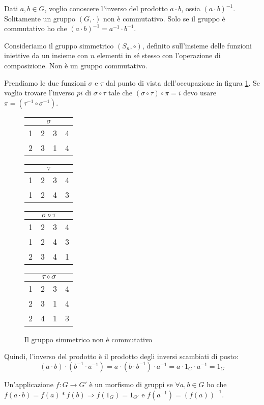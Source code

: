 Dati $a, b \in G$, voglio conoscere l'inverso del prodotto $a \cdot b$, ossia $(a \cdot b)^{-1}$. Solitamente un gruppo $(G, \cdot)$ non \`e commutativo. Solo se il gruppo \`e commutativo ho che $(a \cdot b)^{-1} = a^{-1} \cdot b^{-1}$.

Consideriamo il gruppo simmetrico $(S_n, \circ)$, definito sull'insieme delle funzioni iniettive da un insieme con $n$ elementi in s\'e stesso con l'operazione di composizione. Non \`e un gruppo commutativo.

Prendiamo le due funzioni $\sigma$ e $\tau$ dal punto di vista dell'occupazione in figura \ref{fig:gruppo_simmetrico}. Se voglio trovare l'inverso $pi$ di $\sigma \circ \tau$ tale che $(\sigma \circ \tau) \circ \pi = i$ devo usare $\pi = (\tau^{-1} \circ \sigma^{-1})$.

\begin{figure}[ht]
\centering
\begin{tabular}{cccc}
\multicolumn{4}{c}{$\sigma$} \\
\hline
1 & 2 & 3 & 4 \\
2 & 3 & 1 & 4
\end{tabular} \qquad
\begin{tabular}{cccc}
\multicolumn{4}{c}{$\tau$} \\
\hline
1 & 2 & 3 & 4 \\
1 & 2 & 4 & 3
\end{tabular}

\begin{tabular}{cccc}
\multicolumn{4}{c}{$\sigma \circ \tau$} \\
\hline
1 & 2 & 3 & 4 \\
1 & 2 & 4 & 3 \\
2 & 3 & 4 & 1
\end{tabular} \qquad
\begin{tabular}{cccc}
\multicolumn{4}{c}{$\tau \circ \sigma$} \\
\hline
1 & 2 & 3 & 4 \\
2 & 3 & 1 & 4 \\
2 & 4 & 1 & 3
\end{tabular}
\caption{\label{fig:gruppo_simmetrico}Il gruppo simmetrico non \`e commutativo}
\end{figure}

Quindi, l'inverso del prodotto \`e il prodotto degli inversi scambiati di posto:
\[
(a \cdot b) \cdot (b^{-1} \cdot a^{-1}) = a \cdot (b \cdot b^{-1}) 
\cdot a^{-1} = a \cdot 1_G \cdot a^{-1} = 1_G
\]

Un'applicazione $f : G \to G'$ \`e un morfismo di gruppi se $\forall a, b \in G$ ho che $f(a \cdot b) = f(a) \ast f(b) \Rightarrow f(1_G) = 1_{G'}$ e $f(a^{-1}) = (f(a))^{-1}$.

